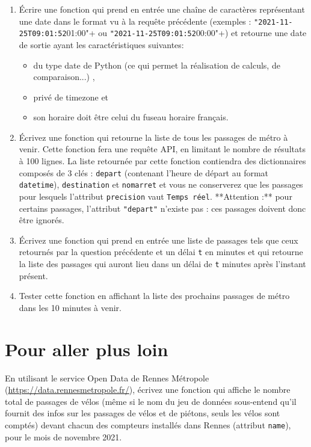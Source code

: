 \documentclass[11pt,a4paper]{article}
\begin{document}
\begin{enumerate}
    \item Écrire une fonction qui prend en entrée une chaîne de caractères 
        représentant une date dans le format vu à la requête précédente (exemples : 
        \verb+"2021-11-25T09:01:52+01:00"+  ou \verb+"2021-11-25T09:01:52+00:00"+)
        et retourne une date de sortie ayant les caractéristiques suivantes:
        \begin{itemize}
            \item du type date de Python (ce qui permet la réalisation de calculs, de comparaison...) ,
            \item privé de timezone et
            \item son horaire doit être celui du fuseau horaire français.
        \end{itemize}
    \item Écrivez une fonction qui retourne la liste de tous les passages de métro à
        venir. Cette fonction fera une requête API, en limitant le nombre de résultats à 100 lignes. 
        La liste retournée par cette fonction contiendra des dictionnaires composés de 3 clés : 
        \verb+depart+ (contenant l'heure de départ au format \verb+datetime+), \verb+destination+ et \verb+nomarret+ 
        et vous ne conserverez que les passages pour lesquels l'attribut \verb+precision+ vaut \verb+Temps réel+.
        **Attention :** pour certains passages, l'attribut \verb+"depart"+ n'existe pas :
        ces passages doivent donc être ignorés.
    \item Écrivez une fonction qui prend en entrée une liste de passages tels que ceux retournés par la question 
        précédente et un délai \verb+t+ en minutes et qui retourne la liste des passages qui auront lieu dans un délai de \verb+t+ 
        minutes après l'instant présent. 
    \item Tester cette fonction en affichant la liste des prochains passages de métro dans 
        les 10 minutes à venir.
\end{enumerate}

\section{Pour aller plus loin}

En utilisant le service Open Data de Rennes Métropole (\url{https://data.rennesmetropole.fr/}), écrivez une
fonction qui affiche le nombre total de passages de vélos (même si le nom du jeu de données 
sous-entend qu'il fournit des infos sur les passages de vélos et de piétons, seuls les vélos 
sont comptés) devant chacun des 
compteurs installés dans Rennes (attribut \verb+name+), pour le mois de novembre 2021.
\end{document}
